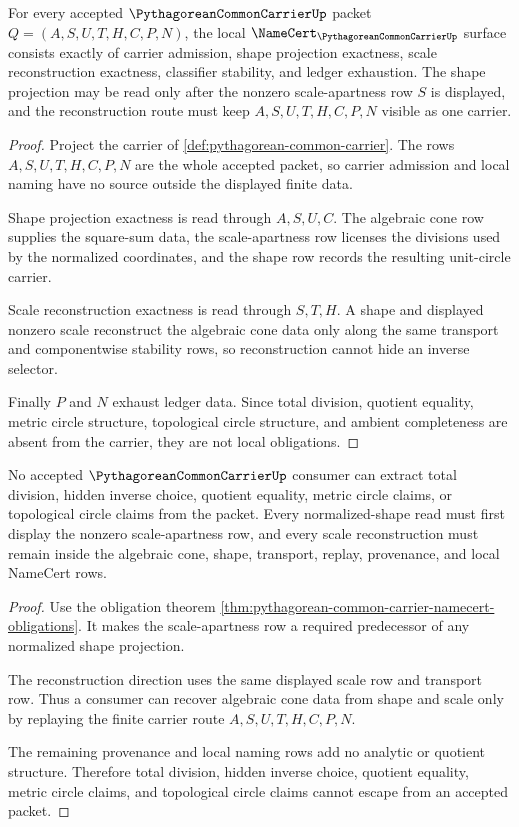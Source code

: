 \begin{theorem}
\label{thm:pythagorean-common-carrier-namecert-obligations}
For every accepted $\PythagoreanCommonCarrierUp$ packet $Q=(A,S,U,T,H,C,P,N)$, the local $\NameCert_{\PythagoreanCommonCarrierUp}$ surface consists exactly of carrier admission, shape projection exactness, scale reconstruction exactness, classifier stability, and ledger exhaustion. The shape projection may be read only after the nonzero scale-apartness row $S$ is displayed, and the reconstruction route must keep $A,S,U,T,H,C,P,N$ visible as one carrier.
\end{theorem}
\begin{proof}
Project the carrier of \autoref{def:pythagorean-common-carrier}. The rows $A,S,U,T,H,C,P,N$ are the whole accepted packet, so carrier admission and local naming have no source outside the displayed finite data.

Shape projection exactness is read through $A,S,U,C$. The algebraic cone row supplies the square-sum data, the scale-apartness row licenses the divisions used by the normalized coordinates, and the shape row records the resulting unit-circle carrier.

Scale reconstruction exactness is read through $S,T,H$. A shape and displayed nonzero scale reconstruct the algebraic cone data only along the same transport and componentwise stability rows, so reconstruction cannot hide an inverse selector.

Finally $P$ and $N$ exhaust ledger data. Since total division, quotient equality, metric circle structure, topological circle structure, and ambient completeness are absent from the carrier, they are not local obligations.
\end{proof}

\begin{theorem}
\label{thm:pythagorean-common-carrier-shape-scale-nonescape}
No accepted $\PythagoreanCommonCarrierUp$ consumer can extract total division, hidden inverse choice, quotient equality, metric circle claims, or topological circle claims from the packet. Every normalized-shape read must first display the nonzero scale-apartness row, and every scale reconstruction must remain inside the algebraic cone, shape, transport, replay, provenance, and local NameCert rows.
\end{theorem}
\begin{proof}
Use the obligation theorem \autoref{thm:pythagorean-common-carrier-namecert-obligations}. It makes the scale-apartness row a required predecessor of any normalized shape projection.

The reconstruction direction uses the same displayed scale row and transport row. Thus a consumer can recover algebraic cone data from shape and scale only by replaying the finite carrier route $A,S,U,T,H,C,P,N$.

The remaining provenance and local naming rows add no analytic or quotient structure. Therefore total division, hidden inverse choice, quotient equality, metric circle claims, and topological circle claims cannot escape from an accepted packet.
\end{proof}

